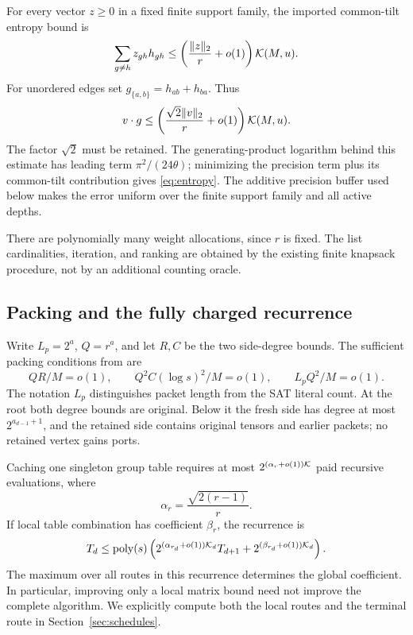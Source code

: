 For every vector $z\ge0$ in a fixed finite support family, the imported
common-tilt entropy bound is
\begin{equation}\label{eq:entropy}
 \sum_{g\ne h}z_{gh}h_{gh}
 \le\left(\frac{\lVert z\rVert_2}{r}+o(1)\right)\mathcal K(M,u).
\end{equation}
For unordered edges set $g_{\{a,b\}}=h_{ab}+h_{ba}$. Thus
\begin{equation}\label{eq:unordered}
 v\cdot g\le
 \left(\frac{\sqrt2\lVert v\rVert_2}{r}+o(1)\right)\mathcal K(M,u).
\end{equation}
The factor $\sqrt2$ must be retained. The generating-product logarithm
behind this estimate has leading term $\pi^2/(24\theta)$; minimizing
the precision term plus its common-tilt contribution gives
\eqref{eq:entropy}. The additive precision buffer used below makes the
error uniform over the finite support family and all active depths.

There are polynomially many weight allocations, since $r$ is fixed.
The list cardinalities, iteration, and ranking are obtained by the
existing finite knapsack procedure, not by an additional counting oracle.

\subsection{Packing and the fully charged recurrence}

Write $L_p=2^a$, $Q=r^a$, and let $R,C$ be the two side-degree bounds.
The sufficient packing conditions from \cite{asymmetric} are
\begin{equation}\label{eq:gates}
 QR/M=o(1),\qquad Q^2C(\log s)^2/M=o(1),\qquad L_pQ^2/M=o(1).
\end{equation}
The notation $L_p$ distinguishes packet length from the SAT literal count.
At the root both degree bounds are original. Below it the fresh side has
degree at most $2^{a_{d-1}+1}$, and the retained side contains original
tensors and earlier packets; no retained vertex gains ports.

Caching one singleton group table requires at most
$2^{(\alpha_r+o(1))\mathcal K}$ paid recursive evaluations, where
\[
 \alpha_r=\frac{\sqrt{2(r-1)}}r.
\]
If local table combination has coefficient $\beta_r$, the recurrence is
\begin{equation}\label{eq:paid}
 T_d\le\operatorname{poly}(s)\left(
 2^{(\alpha_{r_d}+o(1))\mathcal K_d}T_{d+1}
 +2^{(\beta_{r_d}+o(1))\mathcal K_d}\right).
\end{equation}
The maximum over all routes in this recurrence determines the global
coefficient. In particular, improving only a local matrix bound need not
improve the complete algorithm. We explicitly compute both the local
routes and the terminal route in Section~\ref{sec:schedules}.

